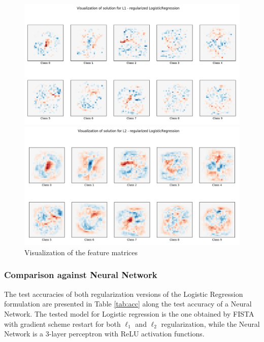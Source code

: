 \documentclass{article}
\begin{document}
\begin{figure}[ht]
    \centering
    \begin{minipage}{.9\textwidth}
        \includegraphics[trim={3.5cm 2cm 3cm 0},clip, width=\textwidth]{img/visual_l1.png}
    \end{minipage}
    \begin{minipage}{.9\textwidth}
        \includegraphics[trim={3.5cm 2cm 3cm 0},clip,width=\textwidth]{img/visual_l2.png}
    \end{minipage}
    \caption{Visualization of the feature matrices}
    \label{fig:vis}
\end{figure}

\subsubsection*{Comparison against Neural Network}
The test accuracies of both regularization versions of the Logistic Regression formulation are presented in Table \ref{tab:acc} along the test accuracy of a Neural Network. The tested model for Logistic regression is the one obtained by FISTA with gradient scheme restart for both $\ell_1$ and $\ell_2$ regularization, while the Neural Network is a 3-layer perceptron with ReLU activation functions.
\end{document}
